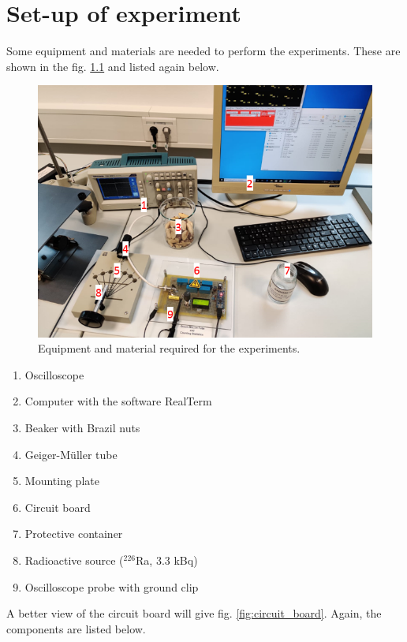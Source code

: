 \chapter{Set-up of experiment}
Some equipment and materials are needed to perform the experiments. These are shown in the fig. \ref{fig:setup} and listed again below.
%
\begin{figure}[H]
	\begin{center}
		\includegraphics[width=14cm]{setup.png}
		\caption{Equipment and material required for the experiments.}  
		\label{fig:setup} 
	\end{center}
\end{figure}
%
\begin{enumerate}
	\item Oscilloscope
	\item Computer with the software RealTerm
	\item Beaker with Brazil nuts
	\item Geiger-Müller tube
	\item Mounting plate
	\item Circuit board
	\item Protective container
	\item Radioactive source ($^{226}$Ra, 3.3 kBq)
	\item Oscilloscope probe with ground clip
\end{enumerate}
%
A better view of the circuit board will give fig. \ref{fig:circuit_board}. Again, the components are listed below.
%
